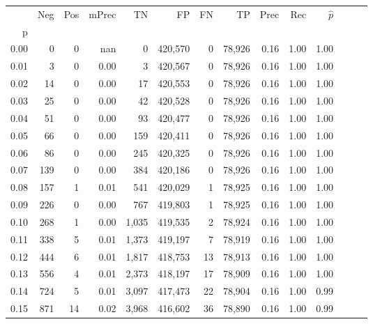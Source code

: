 \begin{tabular}{rrrrrrrrrrrrrr}
\toprule
{} &     Neg &    Pos & mPrec &       TN &       FP &      FN &      TP &  Prec &   Rec & $\hat{p}$ \\
p    &         &        &       &          &          &         &         &       &       &           \\
\midrule
0.00 &       0 &      0 &   nan &        0 &  420,570 &       0 &  78,926 &  0.16 &  1.00 &      1.00 \\
0.01 &       3 &      0 &  0.00 &        3 &  420,567 &       0 &  78,926 &  0.16 &  1.00 &      1.00 \\
0.02 &      14 &      0 &  0.00 &       17 &  420,553 &       0 &  78,926 &  0.16 &  1.00 &      1.00 \\
0.03 &      25 &      0 &  0.00 &       42 &  420,528 &       0 &  78,926 &  0.16 &  1.00 &      1.00 \\
0.04 &      51 &      0 &  0.00 &       93 &  420,477 &       0 &  78,926 &  0.16 &  1.00 &      1.00 \\
0.05 &      66 &      0 &  0.00 &      159 &  420,411 &       0 &  78,926 &  0.16 &  1.00 &      1.00 \\
0.06 &      86 &      0 &  0.00 &      245 &  420,325 &       0 &  78,926 &  0.16 &  1.00 &      1.00 \\
0.07 &     139 &      0 &  0.00 &      384 &  420,186 &       0 &  78,926 &  0.16 &  1.00 &      1.00 \\
0.08 &     157 &      1 &  0.01 &      541 &  420,029 &       1 &  78,925 &  0.16 &  1.00 &      1.00 \\
0.09 &     226 &      0 &  0.00 &      767 &  419,803 &       1 &  78,925 &  0.16 &  1.00 &      1.00 \\
0.10 &     268 &      1 &  0.00 &    1,035 &  419,535 &       2 &  78,924 &  0.16 &  1.00 &      1.00 \\
0.11 &     338 &      5 &  0.01 &    1,373 &  419,197 &       7 &  78,919 &  0.16 &  1.00 &      1.00 \\
0.12 &     444 &      6 &  0.01 &    1,817 &  418,753 &      13 &  78,913 &  0.16 &  1.00 &      1.00 \\
0.13 &     556 &      4 &  0.01 &    2,373 &  418,197 &      17 &  78,909 &  0.16 &  1.00 &      1.00 \\
0.14 &     724 &      5 &  0.01 &    3,097 &  417,473 &      22 &  78,904 &  0.16 &  1.00 &      0.99 \\
0.15 &     871 &     14 &  0.02 &    3,968 &  416,602 &      36 &  78,890 &  0.16 &  1.00 &      0.99 \\

\end{tabular}
